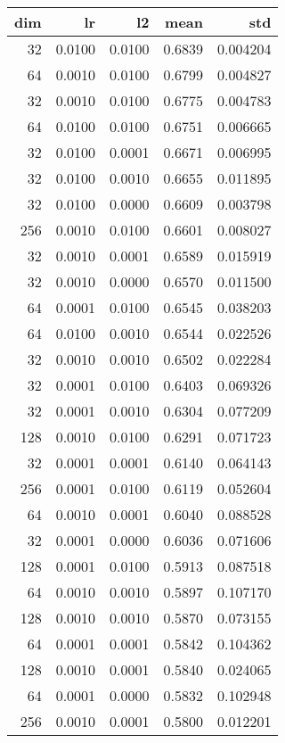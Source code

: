 \begin{tabular}{rrrrr}
\toprule
 dim &      lr &      l2 &    mean &       std \\
\midrule
  32 &  0.0100 &  0.0100 &  0.6839 &  0.004204 \\
  64 &  0.0010 &  0.0100 &  0.6799 &  0.004827 \\
  32 &  0.0010 &  0.0100 &  0.6775 &  0.004783 \\
  64 &  0.0100 &  0.0100 &  0.6751 &  0.006665 \\
  32 &  0.0100 &  0.0001 &  0.6671 &  0.006995 \\
  32 &  0.0100 &  0.0010 &  0.6655 &  0.011895 \\
  32 &  0.0100 &  0.0000 &  0.6609 &  0.003798 \\
 256 &  0.0010 &  0.0100 &  0.6601 &  0.008027 \\
  32 &  0.0010 &  0.0001 &  0.6589 &  0.015919 \\
  32 &  0.0010 &  0.0000 &  0.6570 &  0.011500 \\
  64 &  0.0001 &  0.0100 &  0.6545 &  0.038203 \\
  64 &  0.0100 &  0.0010 &  0.6544 &  0.022526 \\
  32 &  0.0010 &  0.0010 &  0.6502 &  0.022284 \\
  32 &  0.0001 &  0.0100 &  0.6403 &  0.069326 \\
  32 &  0.0001 &  0.0010 &  0.6304 &  0.077209 \\
 128 &  0.0010 &  0.0100 &  0.6291 &  0.071723 \\
  32 &  0.0001 &  0.0001 &  0.6140 &  0.064143 \\
 256 &  0.0001 &  0.0100 &  0.6119 &  0.052604 \\
  64 &  0.0010 &  0.0001 &  0.6040 &  0.088528 \\
  32 &  0.0001 &  0.0000 &  0.6036 &  0.071606 \\
 128 &  0.0001 &  0.0100 &  0.5913 &  0.087518 \\
  64 &  0.0010 &  0.0010 &  0.5897 &  0.107170 \\
 128 &  0.0010 &  0.0010 &  0.5870 &  0.073155 \\
  64 &  0.0001 &  0.0001 &  0.5842 &  0.104362 \\
 128 &  0.0010 &  0.0001 &  0.5840 &  0.024065 \\
  64 &  0.0001 &  0.0000 &  0.5832 &  0.102948 \\
 256 &  0.0010 &  0.0001 &  0.5800 &  0.012201 \\

\end{tabular}
